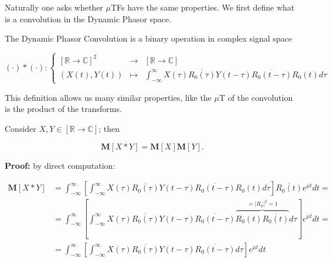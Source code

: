 	Naturally one asks whether $\mu$TFs have the same properties. We first define what is a convolution in the Dynamic Phasor space.

\begin{definition}\label{def:mut_convo} The Dynamic Phasor Convolution is a binary operation in complex signal space

\begin{equation}
	\left(\cdot\right)\ast\left(\cdot\right): \left\{\begin{array}{ccc}
		\left[\mathbb{R}\to\mathbb{C}\right]^2 &\to& \left[\mathbb{R}\to\mathbb{C}\right] \\[3mm] \left(X(t),Y(t)\right) &\mapsto& \displaystyle \int_{-\infty}^{\infty} X\left(\tau\right) \overline{R_0\left(\tau\right)}Y\left(t - \tau\right)\overline{R_0\left(t - \tau\right)} R_0\left(t\right)  d\tau \end{array}\right.
\end{equation}
\end{definition}

	This definition allows us many similar properties, like the $\mu$T of the convolution is the product of the transforms.

\begin{theorem} \label{theo:muT_conv_prod}%
	Consider $X,Y\in\left[\mathbb{R}\to\mathbb{C}\right]$; then

\begin{equation} \mathbf{M}\left[X \ast Y\right] =  \mathbf{M}\left[X\right]\mathbf{M}\left[Y\right] .\end{equation}
\end{theorem}
\textbf{Proof:} by direct computation:

\begin{align}
	\mathbf{M}\left[X \ast Y\right] &= \int_{-\infty}^{\infty} \left[\int_{-\infty}^{\infty}X\left(\tau\right) \overline{R_0\left(\tau\right)}Y\left(t - \tau\right)\overline{R_0\left(t - \tau\right)} R_0\left(t\right) d\tau\right]\overline{R_0\left(t\right)} e^{\mu t}dt = \nonumber\\[3mm]
%
	&= \int_{-\infty}^{\infty} \left[\int_{-\infty}^{\infty}X\left(\tau\right) \overline{R_0\left(\tau\right)}Y\left(t - \tau\right)\overline{R_0\left(t - \tau\right)} \overbrace{R_0\left(t\right)\overline{R_0\left(t\right)}}^{=\left\lvert R_0\right\rvert^2 = 1}  d\tau\right] e^{\mu t}dt = \nonumber\\[3mm]
	&= \int_{-\infty}^{\infty} \left[\int_{-\infty}^{\infty}X\left(\tau\right) \overline{R_0\left(\tau\right)}Y\left(t - \tau\right)\overline{R_0\left(t - \tau\right)}  d\tau\right] e^{\mu t}dt \nonumber\\[3mm]
\end{align}

